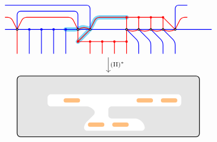 \[\begin{tikzcd}
\begin{tikzpicture}[baseline=-.5ex,scale=1]
\begin{scope}
\draw[color=cyan, rounded corners, line cap=round, line width=5, opacity=0.5] 
(-1.5, -1) -- (-1, -0.5) -- (-0.75, 0) -- (0.5, 0)
(-2,-0.5) -- (-1.5,-0.5) to[out=30, in=150] (-1, -0.5);
%
\draw[thick, blue, rounded corners] 
(-4.5,-0.5) -- (4, -0.5)
(-4.5, 0.5) -- (-1, 0.5) -- (-1, -0.5)
(2.5, -0.5) -- (2.5, 0.5) -- (3,0.5)
(-4, -0.5) -- (-4, 0.25) -- (-1.5, 0.25) -- (-1.5, -0.5)
;
%
\draw[thick, blue, fill] 
(-3.5, -1.5) -- (-3.5, -0.5) circle (1pt)
(-3, -1.5) -- (-3, -0.5) circle (1pt)
(-2.5, -1.5) -- (-2.5, -0.5) circle (1pt)
(-2, -1.5) -- (-2, -0.5) circle (1pt)
;
\draw[thick, blue, rounded corners]
(1, -1.5) -- (1, -1) -- (0.5, -0.5)
(1.5, -1.5) -- (1.5, -1) -- (1, -0.5)
(2, -1.5) -- (2, -1) -- (1.5, -0.5)
(2.5, -1.5) -- (2.5, -1) -- (2,-0.5);
%
\draw[thick, red, fill] 
(-4,-1.5) -- (-4,-0.5) 
(-1.5, -0.5) -- (-1.5, -1) circle (1pt) -- (-1, -1)
(-1, -0.5) -- (-1.5, -1)
(-1, -1.5) -- (-1, -1) circle (1pt)
(-0.5,-1.5) -- (-0.5, -1) circle (1pt) -- (-1, -1) (-0.5, -1) -- (0, -1)
(0, -1.5) -- (0,-1) circle (1pt)
(0.5, -1.5) -- (0.5,-1) circle (1pt) -- (0.5, -0.5) (0.5, -1) -- (0, -1)
(0.5, -0.5) -- (0.5, 0) circle (1pt)
(1, -0.5) -- (1, 0) circle (1pt)
(1.5, -0.5) -- (1.5, 0) circle (1pt)
(2, -0.5) -- (2, 0) circle (1pt)
(2.5, -0.5) -- (2, 0)
;
\draw[thick, red, rounded corners] (-4.5,0) -- (-4.25,0) -- (-4,-0.5) (-4, -0.5) -- (-3.75, 0) -- (-1.75, 0) -- (-1.5, -0.5) 
(-1, -0.5) -- (-0.75, 0) -- (2, 0)
(2.5, -0.5) -- (2.75, 0) -- (3,0)
(0.5, -0.5) to[out=-30, in=-150] (1, -0.5)
(1, -0.5) to[out=-30, in=-150] (1.5, -0.5)
(1.5, -0.5) to[out=-30, in=-150] (2, -0.5)
(2, -0.5) to[out=-30, in=-150] (2.5, -0.5)
(-1.5, -0.5) to[out=30, in=150] (-1, -0.5)
;
%
\foreach \x in {-4, -1.5, -1, 0.5, 1, 1.5, 2, 2.5} {
\draw[thick, fill=white] (\x,-0.5) circle (1pt) ;
}
\end{scope}
\end{tikzpicture}
\arrow[d, "\Move{II}^*"]\\
\begin{tikzpicture}[baseline=-.5ex,scale=1]
\draw[thick, rounded corners, fill=black!10] (-4.5,-1.5) rectangle (3,1);
\fill[white, rounded corners] (-3.25, 0.25) -- (2.25, 0.25) -- (2.25, -0.25) -- (-0.75, -0.25) -- (-0.75, -0.75) -- (0.5, -0.75) -- (0.75, -1) -- (0.75, -1.25) -- (-1.75, -1.25) -- (-1.75, -1) -- (-1.25, -0.5) -- (-1.5, -0.25) -- (-3.25, -0.25) -- cycle;
\begin{scope}
\clip (-4.5,-1.5) rectangle (3,1);
%
\draw[color=cyclecolor1, rounded corners, line cap=round, line width=5, opacity=0.5] (-1.5, -1) -- (-1, -1) (-2.5,0) -- (-2,0) (-0.5, -1) -- (0, -1) (0.5, 0) -- (1, 0) (1.5, 0) -- (2, 0);

\end{scope}
\end{tikzpicture}
\end{tikzcd}\]
